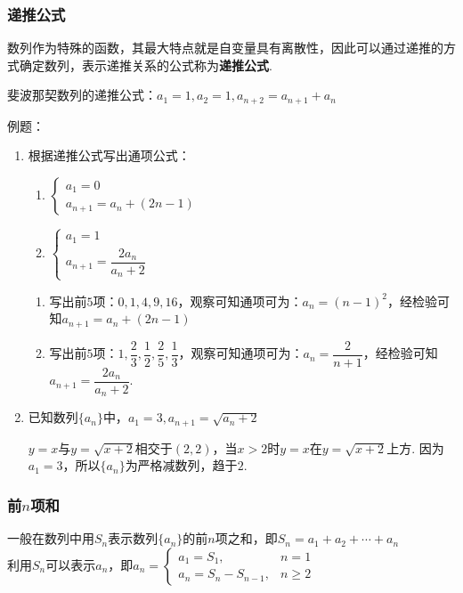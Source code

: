 \subsubsection*{递推公式}
数列作为特殊的函数，其最大特点就是自变量具有离散性，因此可以通过递推的方式确定数列，表示递推关系的公式称为\textbf{递推公式}.
\begin{example}
    斐波那契数列的递推公式：$a_1 = 1, a_2 = 1, a_{n+2} = a_{n+1}+a_n$
\end{example}
例题：
\begin{enumerate}
    \item 根据递推公式写出通项公式：
    \begin{enumerate}
        \item $\left\{\begin{array}{l}
             a_1 = 0  \\
             a_{n+1} = a_n + (2n-1)
        \end{array}\right.$
        \item $\left\{\begin{array}{l}
             a_1 = 1  \\
             a_{n+1} = \dfrac{2a_n}{a_n+2}
        \end{array}\right.$
    \end{enumerate}
    \begin{jieda}
        \begin{enumerate}
            \item 写出前$5$项：$0, 1, 4, 9, 16$，观察可知通项可为：$a_n = (n-1)^2$，经检验可知$a_{n+1} = a_n + (2n-1)$
            \item 写出前$5$项：$1, \dfrac{2}{3}, \dfrac{1}{2}, \dfrac{2}{5}, \dfrac{1}{3}$，观察可知通项可为：$a_n = \dfrac{2}{n+1}$，经检验可知$a_{n+1} = \dfrac{2a_n}{a_n+2}$.
        \end{enumerate}
    \end{jieda}
    \item 已知数列$\{a_n\}$中，$a_1 = 3, a_{n+1} = \sqrt{a_n + 2}$ 
    \begin{jieda}
        $y = x$与$y = \sqrt{x+2}$相交于$(2,2)$，当$x > 2$时$y = x$在$y = \sqrt{x+2}$上方. 因为$a_1 = 3$，所以$\{a_n\}$为严格减数列，趋于$2$.
    \end{jieda}
\end{enumerate}
\subsubsection*{前$n$项和}
一般在数列中用$S_n$表示数列$\{a_n\}$的前$n$项之和，即$S_n = a_1+a_2+\cdots+a_n$ \\
利用$S_n$可以表示$a_n$，即$a_n = \left\{\begin{array}{ll}
             a_1 = S_1, & n = 1  \\
             a_n = S_n - S_{n-1}, & n \geq 2
        \end{array}\right.$
        
